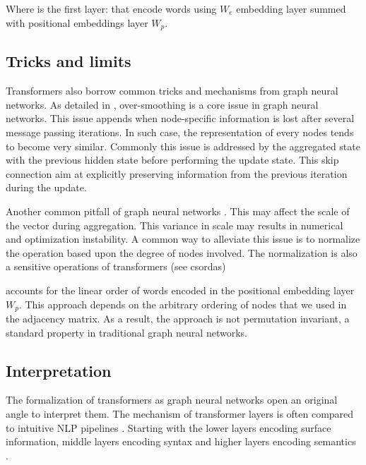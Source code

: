 Where  is the first layer: that encode words using $W_e$ embedding layer summed with positional embeddings layer $W_p$.

\subsection{Tricks and limits}

Transformers also borrow common tricks and mechanisms from graph neural networks.
As detailed in \textcite{hamilton_2020}, over-smoothing is a core issue in graph neural networks.
This issue appends when node-specific information is lost after several message passing iterations. 
In such case, the representation of every nodes tends to become very similar.
Commonly this issue is addressed by  the aggregated state with the previous hidden state before performing the update state.
This skip connection aim at explicitly preserving information from the previous iteration during the update.

Another common pitfall of graph neural networks . 
This may affect the scale of the vector during aggregation.
This variance in scale may results in numerical and optimization instability. 
A common way to alleviate this issue is to normalize the operation based upon the degree of nodes involved.
The normalization is also a sensitive operations of transformers (see csordas) 

 accounts for the linear order of words encoded in the positional embedding layer $W_p$.
This approach depends on the arbitrary ordering of nodes that we used in the adjacency matrix.
As a result, the approach is not permutation invariant, a standard property in traditional graph neural networks.

\subsection{Interpretation}

The formalization of transformers as graph neural networks open an original angle to interpret them.
The mechanism of transformer layers is often compared to intuitive NLP pipelines \parencite{tenney_19}. 
Starting with the lower layers encoding surface information, middle layers encoding syntax and higher layers encoding semantics \parencite{jawahar_19, peters_18}.

